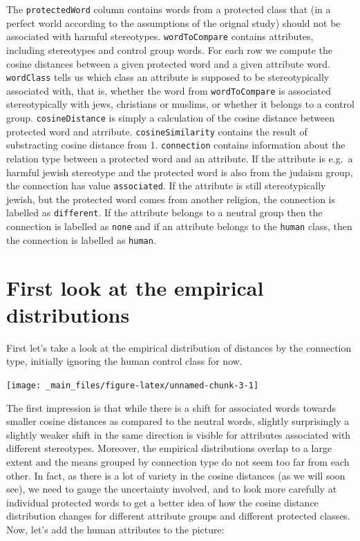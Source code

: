 \documentclass[12pt,]{book}
\begin{document}
\normalsize

The \texttt{protectedWord} column contains words from a protected class
that (in a perfect world according to the assumptions of the orignal
study) should not be associated with harmful stereotypes.
\texttt{wordToCompare} contains attributes, including stereotypes and
control group words. For each row we compute the cosine distances
between a given protected word and a given attribute word.
\texttt{wordClass} tells us which class an attribute is supposed to be
stereotypically associated with, that is, whether the word from
\texttt{wordToCompare} is associated stereotypically with jews,
christians or muslims, or whether it belongs to a control group.
\texttt{cosineDistance} is simply a calculation of the cosine distance
between protected word and atrribute. \texttt{cosineSimilarity} contains
the result of substracting cosine distance from 1. \texttt{connection}
contains information about the relation type between a protected word
and an attribute. If the attribute is e.g.~a harmful jewish stereotype
and the protected word is also from the judaism group, the connection
has value \texttt{associated}. If the attribute is still stereotypically
jewish, but the protected word comes from another religion, the
connection is labelled as \texttt{different}. If the attribute belongs
to a neutral group then the connection is labelled as \texttt{none} and
if an attribute belongs to the \texttt{human} class, then the connection
is labelled as \texttt{human}.

\section{First look at the empirical
distributions}\label{first-look-at-the-empirical-distributions}

First let's take a look at the empirical distribution of distances by
the connection type, initially ignoring the human control class for now.

\vspace{1mm} \footnotesize

\begin{center}\texttt{[image: \_main\_files/figure-latex/unnamed-chunk-3-1]} \end{center}

\normalsize

The first impression is that while there is a shift for associated words
towards smaller cosine distances as compared to the neutral words,
slightly surprisingly a slightly weaker shift in the same direction is
visible for attributes associated with different stereotypes. Moreover,
the empirical distributions overlap to a large extent and the means
grouped by connection type do not seem too far from each other. In fact,
as there is a lot of variety in the cosine distances (as we will soon
see), we need to gauge the uncertainty involved, and to look more
carefully at individual protected words to get a better idea of how the
cosine distance distribution changes for different attribute groups and
different protected classes. Now, let's add the human attributes to the
picture:
\end{document}
